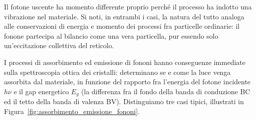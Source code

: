 Il fotone uscente ha momento differente proprio perché il processo ha indotto una vibrazione nel materiale. Si noti, in entrambi i casi, la natura del tutto analoga alle conservazioni di energia e momento dei processi fra particelle ordinarie: il fonone partecipa al bilancio come una vera particella, pur essendo solo un'eccitazione collettiva del reticolo.

\begin{example}
I processi di assorbimento ed emissione di fononi hanno conseguenze immediate sulla spettroscopia ottica dei cristalli: determinano se e come la luce venga assorbita dal materiale, in funzione del rapporto fra l'energia del fotone incidente \( h\nu \) e il gap energetico \( E_g \) (la differenza fra il fondo della banda di conduzione BC ed il tetto della banda di valenza BV). Distinguiamo tre casi tipici, illustrati in Figura~\ref{fig:assorbimento_emissione_fononi}.


\end{example}

